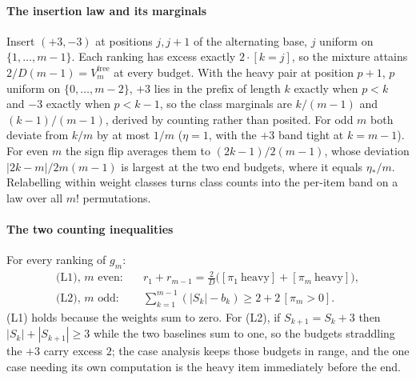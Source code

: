 \paragraph{The insertion law and its marginals} Insert $(+3,-3)$ at positions $j,j+1$ of
the alternating base, $j$ uniform on $\{1,\dots,m-1\}$. Each ranking has excess exactly
$2\cdot[k=j]$, so the mixture attains $2/D(m-1)=V^{\mathrm{free}}_{m}$ at every budget.
With the heavy pair at position $p+1$, $p$ uniform on $\{0,\dots,m-2\}$, $+3$ lies in the
prefix of length $k$ exactly when $p<k$ and $-3$ exactly when $p<k-1$, so the class
marginals are $k/(m-1)$ and $(k-1)/(m-1)$, derived by counting rather than posited. For odd
$m$ both deviate from $k/m$ by at most $1/m$ ($\eta=1$, with the $+3$ band tight at
$k=m-1$). For even $m$ the sign flip averages them to $(2k-1)/2(m-1)$, whose deviation
$|2k-m|/2m(m-1)$ is largest at the two end budgets, where it equals $\eta_{*}/m$. Relabelling
within weight classes turns class counts into the per-item band on a law over all $m!$
permutations.


\paragraph{The two counting inequalities} For every ranking of $g_{m}$:
\begin{align*}
\text{(L1), $m$ even:}\quad & r_{1}+r_{m-1}=\tfrac{2}{D}\bigl([\pi_{1}\ \text{heavy}]
  +[\pi_{m}\ \text{heavy}]\bigr),\\
\text{(L2), $m$ odd:}\quad & \textstyle\sum_{k=1}^{m-1}(|S_{k}|-b_{k})\ge
  2+2\,[\pi_{m}>0].
\end{align*}
(L1) holds because the weights sum to zero. For (L2), if $S_{k+1}=S_{k}+3$ then
$|S_{k}|+|S_{k+1}|\ge3$ while the two baselines sum to one, so the budgets straddling the
$+3$ carry excess $2$; the case analysis keeps those budgets in range, and the one case
needing its own computation is the heavy item immediately before the end.

